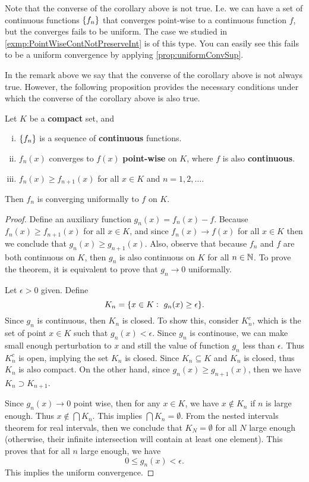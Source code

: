 \begin{remark}
	Note that the converse of the corollary above is not true. I.e. we can have a set of continuous functions $ \{f_n\} $ that converges point-wise to a continuous function $ f  $, but the converges fails to be uniform. The case we studied in \autoref{exmp:PointWiseContNotPreserveInt} is of this type. You can easily see this fails to be a uniform convergence by applying \autoref{prop:uniformConvSup}.
\end{remark}

In the remark above we say that the converse of the corollary above is not always true. However, the following proposition provides the necessary conditions under which the converse of the corollary above is also true. 


\begin{proposition}
	Let $ K $ be a \textbf{compact} set, and 
	\begin{enumerate}[(i),noitemsep]
		\item $ \{f_n\} $ is a sequence of \textbf{continuous} functions.
		\item $ f_n(x) $ converges to $ f(x) $ \textbf{ point-wise} on $ K $, where $ f $ is also \textbf{continuous}.
		\item $ f_n(x) \geq f_{n+1}(x) $ for all $ x\in K $ and $ n=1,2,\hdots. $
	\end{enumerate}
	Then $ f_n $ is converging uniformally to $ f $ on $  K $.
\end{proposition}

\begin{proof}
	Define an auxiliary function $ g_n(x) = f_n(x)-f$. Because $ f_n(x) \geq f_{n+1}(x) $ for all $ x \in K $, and since $ f_n(x)\to f(x) $ for all $ x\in K $ then we conclude that $ g_n(x) \geq g_{n+1}(x) $. Also, observe that because $ f_n $ and $ f $ are both continuous on $ K $, then $ g_n $ is also continuous on $ K $ for all $ n \in \mathbb{N} $. To prove the theorem, it is equivalent to prove that $ g_n \to 0$ uniformally. 
	
	\noindent Let $\epsilon>0$ given. Define 
	\[ K_n = \{x\in K:\ g_n(x) \geq \epsilon\}. \]
	Since $ g_n $ is continuous, then $ K_n $ is closed. To show this, consider $ K_n^c $, which is the set of point $ x \in K $ such that $ g_n(x)<\epsilon $. Since $ g_n $ is continouse, we can make small enough perturbation to $  x $ and still the value of function $ g_n $ less than $ \epsilon $. Thus $ K_n^c $ is open, implying the set $ K_n $ is closed. Since $ K_n \subseteq K $ and $ K_n  $ is closed, thus $ K_n $ is also compact. On the other hand, since $ g_n(x) \geq g_{n+1}(x)  $, then we have 
	$ K_n \supset K_{n+1} $.  
	
	\noindent Since $ g_n(x) \to 0 $ point wise, then for any $ x \in K $,  we have $ x \notin K_n $ if $ n $ is large enough. Thus $ x \notin \bigcap K_n $. This implies $ \bigcap K_n = \emptyset $. From the nested intervals theorem for real intervals, then we conclude that $ K_N = \emptyset$ for all $ N $ large enough (otherwise, their infinite intersection will contain at least one element). This proves that for all $ n $ large enough, we have
	\[ 0 \leq g_n(x) < \epsilon. \]
	This implies the uniform convergence. 
\end{proof}


